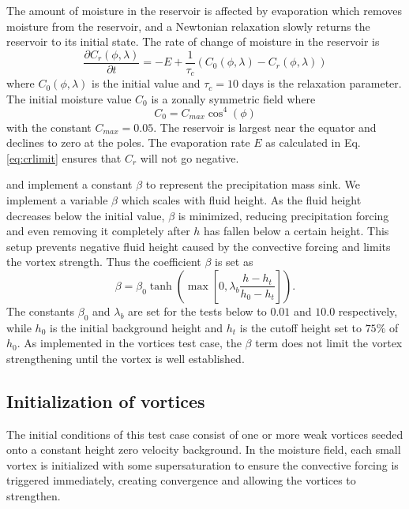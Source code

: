     The amount of moisture in the reservoir is affected by
    evaporation which removes moisture from 
    the reservoir, and a Newtonian relaxation slowly returns the reservoir to its initial state. 
    The rate of change of moisture in the reservoir is
    \begin{equation}
        \label{eq:ocean} 
        \frac{\partial C_r(\phi,\lambda)}{\partial t} = - E + \frac{1}{\tau_c}(C_0(\phi,\lambda) - C_r(\phi,\lambda))
    \end{equation}
    where $C_0(\phi,\lambda)$ is the initial value and $\tau_c = 10$ days 
    is the relaxation parameter. The initial moisture value $C_0$
    is a zonally symmetric field where
   \begin{equation}
     \label{eq:s0} C_0 = C_{max} \cos^4(\phi)
   \end{equation}
   with the constant $C_{max}= 0.05$. The reservoir is largest near the equator and 
   declines to zero at the poles.  The evaporation rate $E$ as calculated in Eq. \ref{eq:crlimit} 
   ensures that $C_r$ will not go negative.
   
    \cite{bouchut2009fronts} and \cite{lahaye2016understanding} implement a constant 
    $\beta$ to represent the precipitation mass sink. We implement a variable $\beta$ which scales with
    fluid height. As the fluid height decreases below the initial value, $\beta$ is 
    minimized, reducing precipitation forcing and even removing it completely after $h$ has fallen below a certain height. 
    This setup prevents negative fluid height caused by the convective forcing
    and limits the vortex strength.
    Thus the coefficient $\beta$ is set as 
  \begin{equation}
    \label{eq:beta} 
    \beta = \beta_0 \tanh\left(\max\left[0, \lambda_b \frac{h - h_t}{h_0 - h_t}\right]\right).
  \end{equation}
   The constants $\beta_0$ and $\lambda_b$ are set for the tests below to $0.01$ and $10.0$ respectively, 
   while $h_0$ is the initial background height and $h_t$ is the cutoff height set to $75\%$ of $h_0$.
   As implemented in the vortices test case, the $\beta$ term does not limit the vortex strengthening
   until the vortex is well established.

 \subsection{Initialization of vortices}
  The initial conditions of this test case consist of
  one or more weak vortices seeded onto a constant height zero velocity background.
  In the moisture field, each small vortex is initialized with some supersaturation
  to ensure the convective forcing is triggered immediately, creating convergence 
  and allowing the vortices to strengthen.
  
